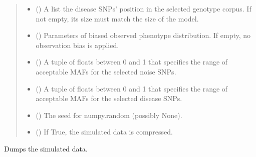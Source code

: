 \documentclass[a4paper,10pt,english]{sphinxhowto}
\begin{document}
\begin{fulllineitems}
\begin{fulllineitems}
\begin{quote}
\begin{description}
\begin{itemize}
\item {} 
 () \textendash{} A list the disease SNPs’ position in the selected genotype corpus. If not empty, its size must match the size of the model.

\item {} 
 () \textendash{} Parameters of biased observed phenotype distribution. If empty, no observation bias is applied.

\item {} 
 (\sphinxstyleliteralemphasis{\sphinxupquote{,}}) \textendash{} A tuple of floats between 0 and 1 that specifies the range of acceptable MAFs for the selected noise SNPs.

\item {} 
 (\sphinxstyleliteralemphasis{\sphinxupquote{,}}) \textendash{} A tuple of floats between 0 and 1 that specifies the range of acceptable MAFs for the selected disease SNPs.

\item {} 
 () \textendash{} The seed for numpy.random (possibly None).

\item {} 
 () \textendash{} If True, the simulated data is compressed.

\end{itemize}

\end{description}\end{quote}

\end{fulllineitems}


\begin{fulllineitems}
\label{\detokenize{utils:utils.data_simulator.DataSimulator.dump_simulated_data}}
Dumps the simulated data.


\end{fulllineitems}
\end{fulllineitems}
\end{document}
